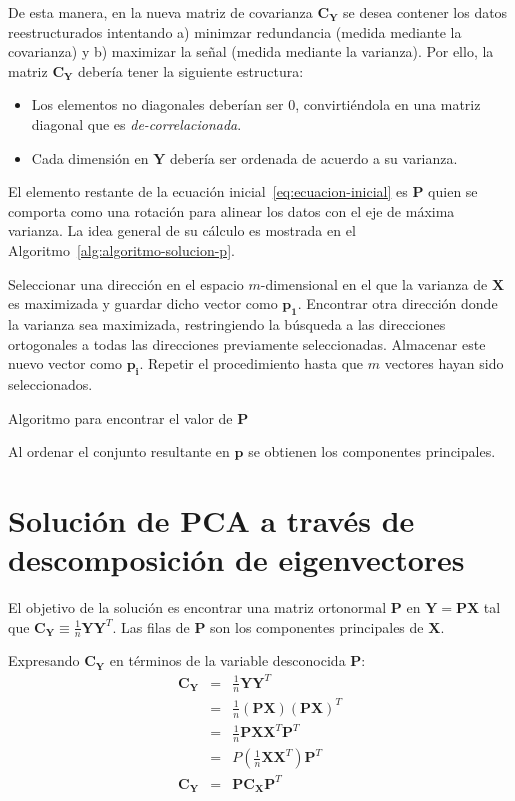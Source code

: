 \documentclass{article}
\begin{document}
De esta manera, en la nueva matriz de covarianza $\mathbf{C_Y}$ se desea contener los datos reestructurados intentando a) minimzar redundancia (medida mediante la covarianza) y b) maximizar la señal (medida mediante la varianza).
Por ello, la matriz $\mathbf{C_Y}$ debería tener la siguiente estructura:
\begin{itemize}
	\item Los elementos no diagonales deberían ser 0, convirtiéndola en una matriz diagonal que es \emph{de-correlacionada}.
	\item Cada dimensión en $\mathbf{Y}$ debería ser ordenada de acuerdo a su varianza.
\end{itemize}

El elemento restante de la ecuación inicial~\ref{eq:ecuacion-inicial} es $\mathbf{P}$ quien se comporta como una rotación para alinear los datos con el eje de máxima varianza.
La idea general de su cálculo es mostrada en el Algoritmo~\ref{alg:algoritmo-solucion-p}.

\begin{algorithm} 
\begin{algorithmic}[1] 
\STATE Seleccionar una dirección en el espacio $m$-dimensional en el que la varianza de $\mathbf{X}$ es maximizada y guardar dicho vector como $\mathbf{p_1}$.
\STATE Encontrar otra dirección donde la varianza sea maximizada, restringiendo la búsqueda a las direcciones ortogonales a todas las direcciones previamente seleccionadas. Almacenar este nuevo vector como $\mathbf{p_i}$.
\STATE Repetir el procedimiento hasta que $m$ vectores hayan sido seleccionados.
\end{algorithmic} 
\caption{Algoritmo para encontrar el valor de $\mathbf{P}$} 
\label{alg:algoritmo-solucion-p}
\end{algorithm}

Al ordenar el conjunto resultante en $\mathbf{p}$ se obtienen los componentes principales.

\section{Solución de PCA a través de descomposición de eigenvectores}
\label{sec:solucion_de_pca_a_traves_de_eigenvectores}
El objetivo de la solución es encontrar una matriz ortonormal $\mathbf{P}$ en $\mathbf{Y} = \mathbf{PX}$ tal que $\mathbf{C_Y} \equiv \frac{1}{n}\mathbf{YY}^T$.
Las filas de $\mathbf{P}$ son los componentes principales de $\mathbf{X}$.

Expresando $\mathbf{C_Y}$ en términos de la variable desconocida $\mathbf{P}$:
\begin{eqnarray}
\mathbf{C_Y} 	&=& \frac{1}{n} \mathbf{YY}^T \\
				&=& \frac{1}{n} (\mathbf{PX})(\mathbf{PX})^T \\
				&=& \frac{1}{n} \mathbf{PXX}^T\mathbf{P}^T \\
				&=& P(\frac{1}{n} \mathbf{XX}^T)\mathbf{P}^T \\
\mathbf{C_Y}	&=& \mathbf{PC_XP}^T
\end{eqnarray}
\end{document}
